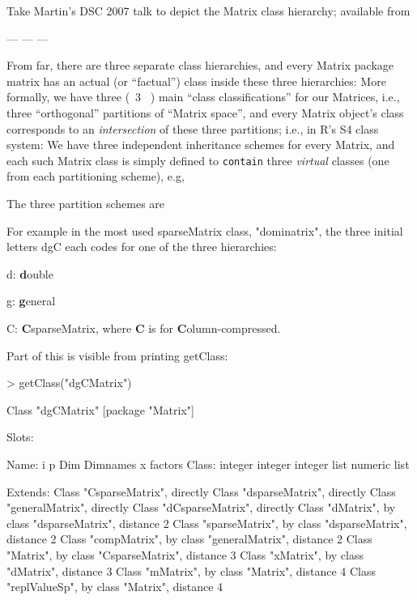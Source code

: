 \documentclass{article}
\begin{document}
Take Martin's DSC 2007 talk to depict the Matrix class hierarchy;
available from {\small

 --- --- --- %

From far, there are three separate class hierarchies, and every Matrix package
matrix has an actual (or ``factual'') class inside these three hierarchies:
More formally, we have three (\ 3 \ ) main ``class classifications'' for our Matrices, i.e.,\\
three ``orthogonal'' partitions of  ``Matrix space'', and every Matrix
object's class corresponds to an \emph{intersection} of these three partitions;
i.e., in R's S4 class system: We have three independent inheritance
schemes for every Matrix, and each such Matrix class is simply defined to
\texttt{contain} three \emph{virtual} classes (one from each partitioning
scheme), e.g,

The three partition schemes are

For example in the most used sparseMatrix class, "dominatrix",
the three initial letters dgC each codes for one of the three hierarchies:
\begin{description}
\item{d: } \textbf{d}ouble
\item{g: } \textbf{g}eneral
\item{C: } \textbf{C}sparseMatrix, where \textbf{C} is for \textbf{C}olumn-compressed.
\end{description}
Part of this is visible from printing getClass:
\begin{Schunk}
\begin{Sinput}
> getClass("dgCMatrix")
\end{Sinput}
\begin{Soutput}
Class "dgCMatrix" [package "Matrix"]

Slots:
                                                            
Name:         i        p      Dim Dimnames        x  factors
Class:  integer  integer  integer     list  numeric     list

Extends: 
Class "CsparseMatrix", directly
Class "dsparseMatrix", directly
Class "generalMatrix", directly
Class "dCsparseMatrix", directly
Class "dMatrix", by class "dsparseMatrix", distance 2
Class "sparseMatrix", by class "dsparseMatrix", distance 2
Class "compMatrix", by class "generalMatrix", distance 2
Class "Matrix", by class "CsparseMatrix", distance 3
Class "xMatrix", by class "dMatrix", distance 3
Class "mMatrix", by class "Matrix", distance 4
Class "replValueSp", by class "Matrix", distance 4
\end{Soutput}
\end{Schunk}

}
\end{document}
